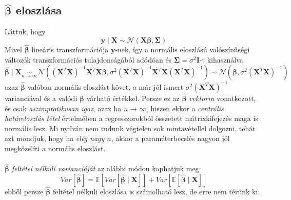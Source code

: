 \documentclass[14p]{report}
\def\pmb{\boldsymbol}
\def\ebeta{\hat{\pmb{\beta}}}
\begin{document}
	\subsection{$\ebeta$ eloszlása}
	Láttuk, hogy
	\[
		\pmb{y} \mid \pmb{X} \sim \mathcal{N}(\pmb{X}\pmb{\beta}, \pmb{\Sigma})
	\]
	Mivel $\ebeta$ lineáris transzformációja $\pmb{y}$-nek, így a normális eloszlású valószínűségi változók transzformációs tulajdonságából adódóan és $\pmb{\Sigma} = \sigma^2\pmb{I}$-t kihasználva
	\[
		\ebeta \mid \pmb{X} \underset{n \rightarrow \infty}{\sim} \mathcal{N}((\pmb{X}^T\pmb{X})^{-1}\pmb{X}^T\pmb{X}\pmb{\beta}, \sigma^2(\pmb{X}^T\pmb{X})^{-1}\pmb{X}^T\pmb{X}(\pmb{X}^T\pmb{X})^{-1}) \sim \mathcal{N}(\pmb{\beta}, \sigma^2(\pmb{X}^T\pmb{X})^{-1})
	\] 
	azaz $\ebeta$ valóban normális eloszlást követ, a már jól ismert $\sigma^2(\pmb{X}^T\pmb{X})^{-1}$ varianciával és a valódi $\pmb{\beta}$ várható értékkel. Persze ez az $\ebeta$ \emph{vektorra} vonatkozott, és csak \emph{aszimptotikusan igaz}, azaz ha $n \rightarrow \infty$, hiszen ekkor a \emph{centrális határeloszlás tétel} értelmében a regresszorokból összetett mátrixkifejezés maga is normális lesz. Mi nyilván nem tudunk végtelen sok mintavétellel dolgozni, tehát azt mondjuk, hogy ha \emph{elég nagy $n$}, akkor a paraméterbecslés nagyon jól megközelíti a normális eloszlást.
	\\
	\\
	$\ebeta$ \emph{feltétel nélküli varianciáját} az alábbi módon kaphatjuk meg:
	\[
		Var[\ebeta] = \mathbb{E}[Var[\ebeta \mid \pmb{X}]] + Var[\mathbb{E}[\ebeta \mid \pmb{X}]]
	\]
	ebből persze $\ebeta$ feltétel nélküli eloszlása is számolható lesz, de erre nem térünk ki.
	
\end{document}
